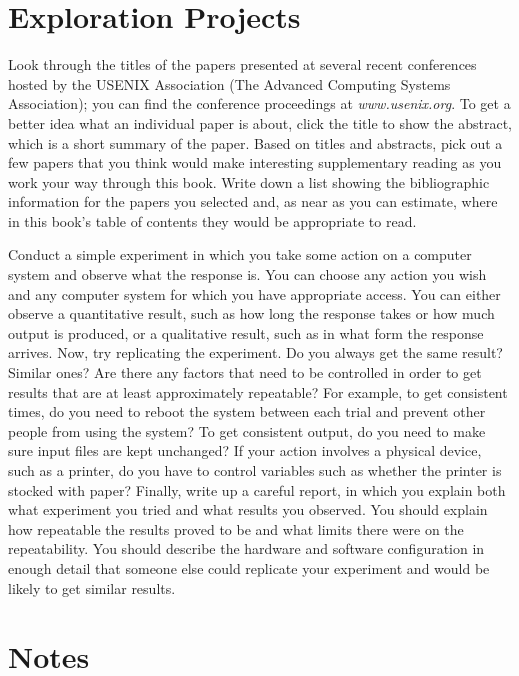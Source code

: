 \section*{Exploration Projects}
\begin{chapterEnumerate}
\item\label{usenix-exploration-project}
Look through the titles of the papers presented at several recent
conferences hosted by the USENIX Association (The Advanced Computing Systems Association); you can find the
conference proceedings at \textit{www.usenix.org}.  To get a better
idea what an individual paper is about, click the title to show the abstract,
which is a short summary of the paper.  Based on titles and abstracts,
pick out a few papers that you think would make interesting
supplementary reading as you work your way through this book.  Write
down a list showing the bibliographic information for the papers you
selected and, as near as you can estimate, where in this book's table
of contents they would be appropriate to read.
\item
Conduct a simple experiment in which you take some action on a
computer system and observe what the response is.  You can choose any
action you wish and any computer system for which you have
appropriate access.  You can either observe a quantitative result,
such as how long the response takes or how much output is produced, or
a qualitative result, such as in what form the response arrives.  Now, try
replicating the experiment.  Do you always get the same result?
Similar ones?  Are there any factors that need to be controlled in
order to get results that are at least approximately repeatable?  For
example, to get consistent times, do you need to reboot the system
between each trial and prevent other people from using the system? To
get consistent output, do you need to make sure input files are kept
unchanged?  If your action involves a physical device, such as a
printer, do you have to control variables such as whether the printer
is stocked with paper?  Finally, write up a careful report, in which
you explain both what experiment you tried and what results you
observed.  You should explain how repeatable the results proved to be
and what limits there were on the repeatability.  You should describe
the hardware and software configuration in enough detail that someone
else could replicate your experiment and would be likely to get
similar results.
\end{chapterEnumerate}

\section*{Notes}

